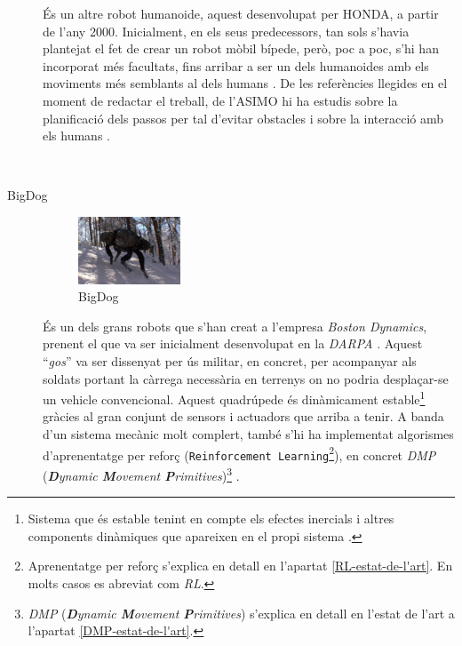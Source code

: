 \documentclass[12pt,a4paper,final,twoside]{report}
\begin{document}
\begin{description}
\begin{minipage}[t]{0.94\linewidth}
És un altre robot humanoide, aquest desenvolupat per HONDA, a partir de l'any 2000. Inicialment, en els seus predecessors, tan sols s'havia plantejat el fet de crear un robot mòbil bípede, però, poc a poc, s'hi han incorporat més facultats, fins arribar a ser un dels humanoides amb els moviments més semblants al dels humans \cite{ASIMO_History}. De les referències llegides en el moment de redactar el treball, de l'ASIMO hi ha estudis sobre la planificació dels passos per tal d'evitar obstacles \cite{Chestnutt2005} i sobre la interacció amb els humans \cite{Mutlu2006}.
\end{minipage}\\


\item[BigDog]
\begin{minipage}[t]{0.94\linewidth}
	\begin{figure}
	    \centering
		\includegraphics[width=0.30\textwidth]{Imatges/BigDog.png}
                \caption{BigDog \cite{Raibert2008}}
	\end{figure}
És un dels grans robots que s'han creat a l'empresa \textit{Boston Dynamics}, prenent el que va ser inicialment desenvolupat en la \textit{DARPA} \cite{Raibert2008}. Aquest ``\textit{gos}'' va ser dissenyat per ús militar, en concret, per acompanyar als soldats portant la càrrega necessària en terrenys on no podria desplaçar-se un vehicle convencional. Aquest quadrúpede és dinàmicament estable\footnote{Sistema que és estable tenint en compte els efectes inercials i altres components dinàmiques que apareixen en el propi sistema \cite{Purushotham2009}.} gràcies al gran conjunt de sensors i actuadors que arriba a tenir. A banda d'un sistema mecànic molt complert, també s'hi ha implementat algorismes d'aprenentatge per reforç (\texttt{Reinforcement Learning}\footnote{Aprenentatge per reforç s'explica en detall en l'apartat \ref{RL-estat-de-l'art}. En molts casos es abreviat com \textit{RL}.}), en concret \textit{DMP} (\textit{\textbf{D}ynamic \textbf{M}ovement \textbf{P}rimitives})\footnote{\textit{DMP} (\textit{\textbf{D}ynamic \textbf{M}ovement \textbf{P}rimitives}) s'explica en detall en l'estat de l'art a l'apartat \ref{DMP-estat-de-l'art}. } \cite{Raibert2008}.
\end{minipage}


\end{description}
\end{document}
